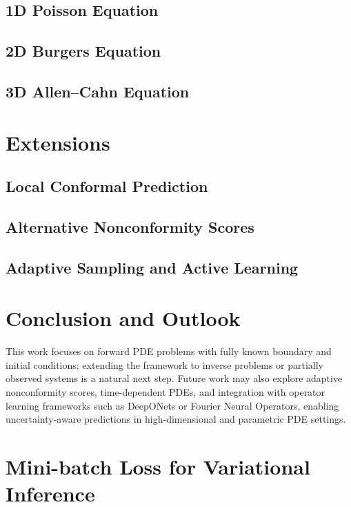 \documentclass[preprint,12pt]{elsarticle}
\begin{document}
\subsection{1D Poisson Equation}
\label{sec:1d}
\subsection{2D Burgers Equation}
\label{sec:2d}
\subsection{3D Allen–Cahn Equation}
\label{sec:3d}

\section{Extensions}
\label{sec:extension}

\subsection{Local Conformal Prediction}
\label{sec:extension:localcp}

\subsection{Alternative Nonconformity Scores}
\label{sec:extension:nonconf}

\subsection{Adaptive Sampling and Active Learning}
\label{sec:extension:active}

\section{Conclusion and Outlook}
\label{sec:conclusion}

% 
This work focuses on forward PDE problems with fully known boundary and initial conditions; extending the framework to inverse problems or partially observed systems is a natural next step. Future work may also explore adaptive nonconformity scores, time-dependent PDEs, and integration with operator learning frameworks such as DeepONets or Fourier Neural Operators, enabling uncertainty-aware predictions in high-dimensional and parametric PDE settings.

\appendix

\section{Mini-batch Loss for Variational Inference}
\label{sec:apd:minibat}
\end{document}
